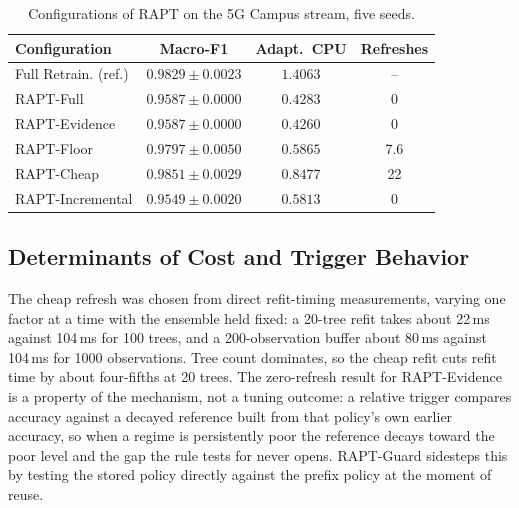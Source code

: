 \begin{table}[t]
\caption{Configurations of RAPT on the 5G Campus stream, five seeds.}
\label{tab:ablation}
\centering
\footnotesize
\begin{tabular}{@{}lccc@{}}
\toprule
{\bf Configuration} & {\bf Macro-F1} & {\bf Adapt.\ CPU} & {\bf Refreshes}\\
\midrule
Full Retrain. (ref.) & $0.9829 \pm 0.0023$& $1.4063$ & -- \\
RAPT-Full & $0.9587 \pm 0.0000$ & $0.4283$ & 0 \\
RAPT-Evidence & $0.9587 \pm 0.0000$ & $0.4260$ & 0\\
RAPT-Floor & $0.9797 \pm 0.0050$ & $0.5865$ & 7.6 \\
RAPT-Cheap & $\mathbf{0.9851 \pm 0.0029}$ & $0.8477$ & 22 \\
RAPT-Incremental & $0.9549 \pm 0.0020$ & $0.5813$ & 0\\
\bottomrule
\end{tabular}
\end{table}


\subsection{Determinants of Cost and Trigger Behavior}
\label{sec:cost}
The cheap refresh was chosen from direct refit-timing measurements, varying one factor at a time with the ensemble held fixed: a 20-tree refit takes about 22\,ms against 104\,ms for 100 trees, and a 200-observation buffer about 80\,ms against 104\,ms for 1000 observations. Tree count dominates, so the cheap refit cuts refit time by about four-fifths at 20 trees. The zero-refresh result for RAPT-Evidence is a property of the mechanism, not a tuning outcome: a relative trigger compares accuracy against a decayed reference built from that policy's own earlier accuracy, so when a regime is persistently poor the reference decays toward the poor level and the gap the rule tests for never opens. RAPT-Guard sidesteps this by testing the stored policy directly against the prefix policy at the moment of reuse.


